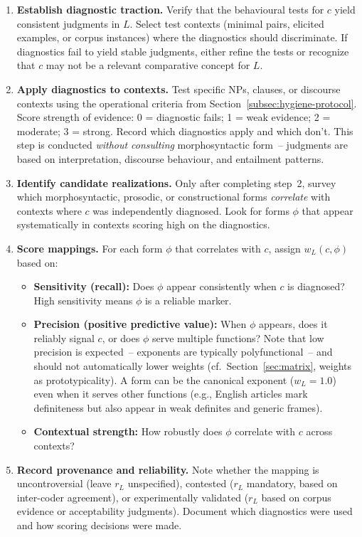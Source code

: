 \documentclass[12pt]{article}
\begin{document}
\begin{enumerate}[label=\arabic*., leftmargin=*]
  \item \textbf{Establish diagnostic traction.} Verify that the behavioural tests for $c$ yield consistent judgments in $L$. Select test contexts (minimal pairs, elicited examples, or corpus instances) where the diagnostics should discriminate. If diagnostics fail to yield stable judgments, either refine the tests or recognize that $c$ may not be a relevant comparative concept for $L$.
  
  \item \textbf{Apply diagnostics to contexts.} Test specific NPs, clauses, or discourse contexts using the operational criteria from Section~\ref{subsec:hygiene-protocol}. Score strength of evidence: 0 = diagnostic fails; 1 = weak evidence; 2 = moderate; 3 = strong. Record which diagnostics apply and which don't. This step is conducted \emph{without consulting} morphosyntactic form~-- judgments are based on interpretation, discourse behaviour, and entailment patterns.
  
  \item \textbf{Identify candidate realizations.} Only after completing step~2, survey which morphosyntactic, prosodic, or constructional forms \emph{correlate} with contexts where $c$ was independently diagnosed. Look for forms $\phi$ that appear systematically in contexts scoring high on the diagnostics.
  
  \item \textbf{Score mappings.} For each form $\phi$ that correlates with $c$, assign $w_L(c, \phi)$ based on:
  \begin{itemize}
    \item \textbf{Sensitivity (recall):} Does $\phi$ appear consistently when $c$ is diagnosed? High sensitivity means $\phi$ is a reliable marker.
    \item \textbf{Precision (positive predictive value):} When $\phi$ appears, does it reliably signal $c$, or does $\phi$ serve multiple functions? Note that low precision is expected~-- exponents are typically polyfunctional~-- and should not automatically lower weights (cf.\ Section~\ref{sec:matrix}, weights as prototypicality). A form can be the canonical exponent ($w_L = 1.0$) even when it serves other functions (e.g., English articles mark definiteness but also appear in weak definites and generic frames).
    \item \textbf{Contextual strength:} How robustly does $\phi$ correlate with $c$ across contexts?
  \end{itemize}
  
  \item \textbf{Record provenance and reliability.} Note whether the mapping is uncontroversial (leave $r_L$ unspecified), contested ($r_L$ mandatory, based on inter-coder agreement), or experimentally validated ($r_L$ based on corpus evidence or acceptability judgments). Document which diagnostics were used and how scoring decisions were made.
\end{enumerate}
\end{document}
